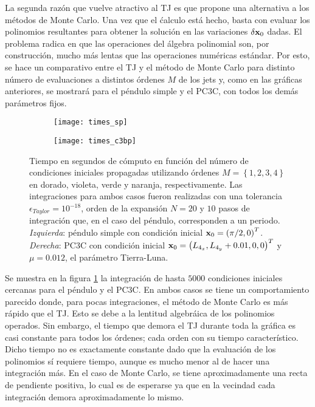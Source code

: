 La segunda razón que vuelve atractivo al TJ es que propone una alternativa a los métodos de Monte Carlo. Una vez que el ćalculo está hecho, basta con evaluar los polinomios resultantes para obtener la solución en las variaciones $\delta \mathbf{x}_0$ dadas. El problema radica en que las operaciones del álgebra polinomial son, por construcción, mucho más lentas que las operaciones numéricas estándar. Por esto, se hace un comparativo entre el TJ y el método de Monte Carlo para distinto número de evaluaciones a distintos órdenes $M$ de los jets y, como en las gráficas anteriores, se mostrará para el péndulo simple y el PC3C, con todos los demás parámetros fijos.

\begin{figure}[h!]
\centering
\begin{subfigure}{0.49\textwidth}
	\centering
	\texttt{[image: times\_sp]}
\end{subfigure}
%
\begin{subfigure}{0.49\textwidth}
	\centering
	\texttt{[image: times\_c3bp]}
\end{subfigure}
\caption{Tiempo en segundos de cómputo en función del número de condiciones iniciales propagadas utilizando órdenes $M = \left\lbrace 1,2,3,4 \right\rbrace$ en dorado, violeta, verde y naranja, respectivamente. Las integraciones para ambos casos fueron realizadas con una tolerancia $\epsilon_{Taylor} = 10^{-18}$, orden de la expansión $N=20$ y $10$ pasos de integración que, en el caso del péndulo, corresponden a un periodo. \textit{Izquierda}: péndulo simple con condición inicial $\mathbf{x}_0 = \left(\pi/2, 0 \right)^T$. \textit{Derecha}: PC3C con condición inicial $\mathbf{x}_0 = \left(L_{4_x}, L_{4_y} + 0.01, 0, 0 \right)^T$ y $\mu = 0.012$, el parámetro Tierra-Luna.}
\label{fig:times}
\end{figure}

Se muestra en la figura \ref{fig:times} la integración de hasta $5000$ condiciones iniciales cercanas para el péndulo y el PC3C. En ambos casos se tiene un comportamiento parecido donde, para pocas integraciones, el método de Monte Carlo es más rápido que el TJ. Esto se debe a la lentitud algebráica de los polinomios operados. Sin embargo, el tiempo que demora el TJ durante toda la gráfica es casi constante para todos los órdenes; cada orden con su tiempo característico. Dicho tiempo no es exactamente constante dado que la evaluación de los polinomios sí requiere tiempo, aunque es mucho menor al de hacer una integración más. En el caso de Monte Carlo, se tiene aproximadamente una recta de pendiente positiva, lo cual es de esperarse ya que en la vecindad cada integración demora aproximadamente lo mismo. 

